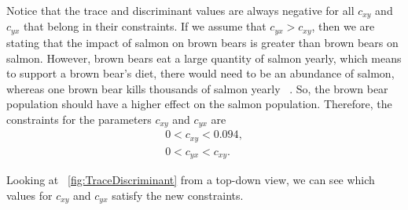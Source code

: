 Notice that the trace and discriminant values are always negative for all $c_{xy}$ and $c_{yx}$ that belong in their constraints.
If we assume that $c_{yx}>c_{xy}$, then we are stating that the impact of salmon on brown bears is greater than brown bears on salmon.
However, brown bears eat a large quantity of salmon yearly, which means to support a brown bear's diet, there would need to be an abundance of salmon, whereas one brown bear kills thousands of salmon yearly ~\cite{deacy2018phenological,hilderbrand1999effect}.
So, the brown bear population should have a higher effect on the salmon population.
Therefore, the constraints for the parameters $c_{xy}$ and $c_{yx}$ are
\begin{equation*}
    \begin{array}{c}
         0<c_{xy}<0.094,  \\
         0<c_{yx}<c_{xy}.
    \end{array}
\end{equation*}


Looking at \figureautorefname~\ref{fig:TraceDiscriminant} from a top-down view, we can see which values for $c_{xy}$ and $c_{yx}$ satisfy the new constraints.

\vspace{3cm}

